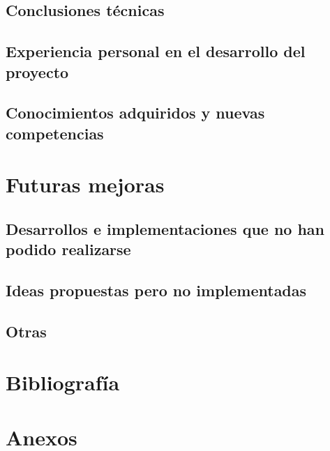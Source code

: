 \section{Conclusiones técnicas}

\section{Experiencia personal en el desarrollo del proyecto}

\section{Conocimientos adquiridos y nuevas competencias}


\chapter{Futuras mejoras}

\section{Desarrollos e implementaciones que no han podido realizarse}

\section{Ideas propuestas pero no implementadas}

\section{Otras}


\chapter{Bibliografía}


\chapter{Anexos}
